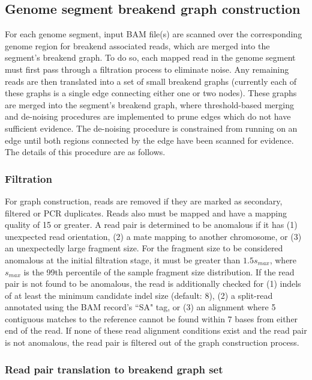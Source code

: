\documentclass{article}
\begin{document}
\subsection{Genome segment breakend graph construction}

For each genome segment, input BAM file(s) are scanned over the corresponding genome region for breakend associated reads, which are merged into the segment's breakend graph. To do so, each mapped read in the genome segment must first pass through a filtration process to eliminate noise. Any remaining reads are then translated into a set of small breakend graphs (currently each of these graphs is a single edge connecting either one or two nodes). These graphs are merged into the segment's breakend graph, where threshold-based merging and de-noising procedures are implemented to prune edges which do not have sufficient evidence. The de-noising procedure is constrained from running on an edge until both regions connected by the edge have been scanned for evidence. The details of this procedure are as follows.

\subsubsection{Filtration}
For graph construction, reads are removed if they are marked as secondary, filtered or PCR duplicates. Reads also must be mapped and have a mapping quality of 15 or greater. A read pair is determined to be anomalous if it has (1) unexpected read orientation, (2) a mate mapping to another chromosome, or (3) an unexpectedly large fragment size. For the fragment size to be considered anomalous at the initial filtration stage, it must be greater than $1.5s_{max}$, where $s_{max}$ is the 99th percentile of the sample fragment size distribution. If the read pair is not found to be anomalous, the read is additionally checked for (1) indels of at least the minimum candidate indel size (default: 8), (2) a split-read annotated using the BAM record's ``SA" tag, or (3) an alignment where 5 contiguous matches to the reference cannot be found within 7 bases from either end of the read. If none of these read alignment conditions exist and the read pair is not anomalous, the read pair is filtered out of the graph construction process.

\subsubsection{Read pair translation to breakend graph set}
\label{sec:pair2graph}
\end{document}
